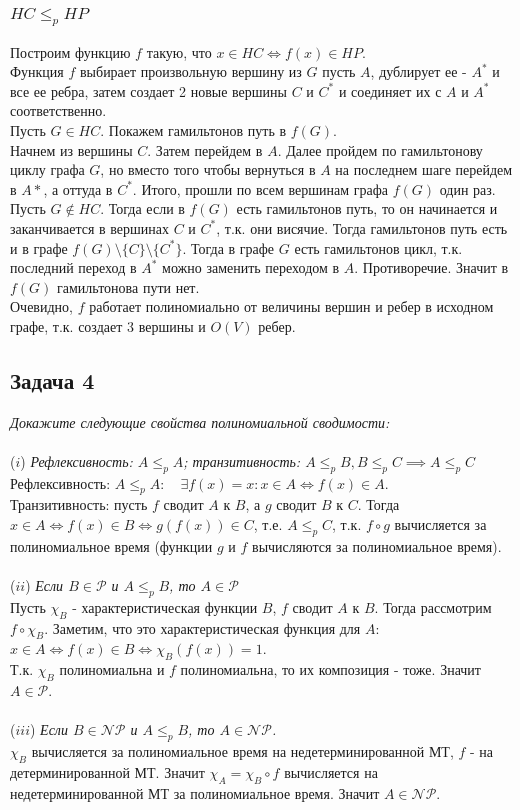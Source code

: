 \documentclass{article}
\begin{document}
\subsubsection*{$HC \leqslant_p HP$}
Построим функцию $f$ такую, что $ x \in HC \iff f(x) \in HP $.\\
Функция $f$ выбирает произвольную вершину из $G$ пусть $A$, дублирует ее - $A^*$ и все ее ребра, затем создает 2 новые вершины $C$ и $C^*$ и соединяет их с $A$ и $A^*$ соответственно.\\
Пусть $G \in HC$. Покажем гамильтонов путь в $f(G)$.\\
Начнем из вершины $C$. Затем перейдем в $A$. Далее пройдем по гамильтонову циклу графа $G$, но вместо того чтобы вернуться в $A$ на последнем шаге перейдем в $A*$, а оттуда в $C^*$. Итого, прошли по всем вершинам графа $f(G)$ один раз.\\
Пусть $G \notin HC$. Тогда если в $f(G)$ есть гамильтонов путь, то он начинается и заканчивается в вершинах $C$ и $C^*$, т.к. они висячие.  Тогда гамильтонов путь есть и в графе $f(G)\setminus \{C\} \setminus \{C^*\}$. Тогда в графе $G$ есть гамильтонов цикл, т.к. последний переход в $A^*$ можно заменить переходом в $A$. Противоречие. Значит в $f(G)$ гамильтонова пути нет.\\
Очевидно, $f$ работает полиномиально от величины вершин и ребер в исходном графе, т.к. создает 3 вершины и $O(V)$ ребер.
\subsection*{Задача 4}
\textit{Докажите следующие свойства полиномиальной сводимости:}\\
\\
($i$) \textit{Рефлексивность: $A\leq_p A$; транзитивность: $A\leq_p B, B\leq_p C \implies A\leq_p C$}\\
Рефлексивность: $A \leqslant_p A: \quad \exists f(x) = x: x \in A \iff f(x) \in A$.\\
Транзитивность: пусть $f$ сводит $A$ к $B$, а $g$ сводит $B$ к $C$. Тогда 
 $x \in A \Leftrightarrow f(x) \in B \Leftrightarrow g(f(x)) \in C$, т.е. $A \leqslant_p C$, т.к. $f \circ g$ вычисляется за полиномиальное время (функции $g$ и $f$ вычисляются за полиномиальное время).\\
 \\
($ii$) \textit{Если $B\in\mathcal{P}$ и $A\leq_p B$, то $A\in\mathcal{P}$}\\
Пусть $\chi_{B}$ - характеристическая функции $B$, $f$ сводит $A$ к $B$. Тогда рассмотрим $f \circ \chi_{B} $. Заметим, что это характеристическая функция для $A$: $x \in A \Leftrightarrow f(x) \in B \Leftrightarrow \chi_B(f(x)) = 1$.\\
Т.к. $\chi_B$ полиномиальна и $f$ полиномиальна, то их композиция - тоже. Значит $A \in \mathcal{P}$.\\
\\
($iii$) \textit{Если $B\in\mathcal{NP}$ и $A\leq_p B$, то $A\in\mathcal{NP}$.}\\
$\chi_B$ вычисляется за полиномиальное время на недетерминированной МТ, $f$ - на детерминированной МТ. Значит $\chi_{A}=\chi_{B} \circ f$ вычисляется на недетерминированной МТ за полиномиальное время. Значит $A \in \mathcal{NP}$.
\end{document}
